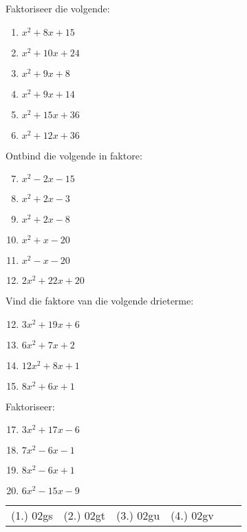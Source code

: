 \begin{exercises}{}
{
Faktoriseer die volgende:
\begin{multicols}{2}
\begin{enumerate}[itemsep=5pt, label=\textbf{\arabic*}. ] 
\item ${x}^{2}+8x+15$
\item ${x}^{2}+10x+24$
\item ${x}^{2}+9x+8$
\item ${x}^{2}+9x+14$
\item ${x}^{2}+15x+36$
\item ${x}^{2}+12x+36$
\end{enumerate}
\end{multicols}


Ontbind die volgende in faktore:
\begin{multicols}{2}
\begin{enumerate}[itemsep=5pt, label=\textbf{\arabic*}. ] 
\setcounter{enumi}{6}
\item ${x}^{2}-2x-15$
\item ${x}^{2}+2x-3$
\item ${x}^{2}+2x-8$
\item ${x}^{2}+x-20$
\item ${x}^{2}-x-20$
\item $2{x}^{2}+22x+20$
\end{enumerate}
\end{multicols}


Vind die faktore van die volgende drieterme:
\begin{multicols}{2}
\begin{enumerate}[itemsep=5pt, label=\textbf{\arabic*}. ] 
\setcounter{enumi}{11}

\item $3{x}^{2}+19x+6$
\item $6{x}^{2}+7x+2$
\item $12{x}^{2}+8x+1$
\item $8{x}^{2}+6x+1$
\end{enumerate}
\end{multicols}

Faktoriseer:
\begin{multicols}{2}
\begin{enumerate}[itemsep=5pt, label=\textbf{\arabic*}. ] 
\setcounter{enumi}{16}
\item $3{x}^{2}+17x-6$
\item $7{x}^{2}-6x-1$
\item $8{x}^{2}-6x+1$
\item $6{x}^{2}-15x-9$
\end{enumerate}
\end{multicols}

\par \practiceinfo
\par \begin{tabular}[h]{cccccc}
(1.)	02gs	&
(2.)	02gt	&
(3.)	02gu	&
(4.)	02gv	&
\end{tabular}
}
\end{exercises}



